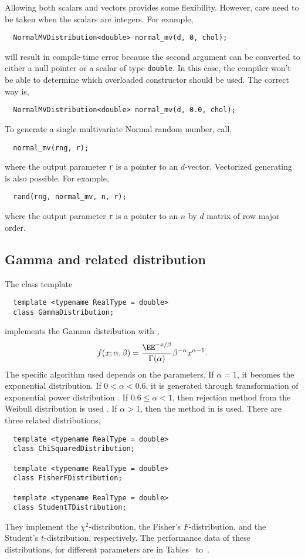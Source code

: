 Allowing both scalars and vectors provides some flexibility. However, care need
to be taken when the scalars are integers. For example,
\begin{Verbatim}
  NormalMVDistribution<double> normal_mv(d, 0, chol);
\end{Verbatim}
will result in compile-time error because the second argument can be converted
to either a null pointer or a scalar of type \verb|double|. In this case, the
compiler won't be able to determine which overloaded constructor should be
used. The correct way is,
\begin{Verbatim}
  NormalMVDistribution<double> normal_mv(d, 0.0, chol);
\end{Verbatim}
To generate a single multivariate Normal random number, call,
\begin{Verbatim}
  normal_mv(rng, r);
\end{Verbatim}
where the output parameter \verb|r| is a pointer to an $d$-vector. Vectorized
generating is also possible. For example,
\begin{Verbatim}
  rand(rng, normal_mv, n, r);
\end{Verbatim}
where the output parameter \verb|r| is a pointer to an $n$ by $d$ matrix of row
major order.

\subsection{Gamma and related distribution}
\label{sub:Gamma and related distribution}

The class template
\begin{Verbatim}
  template <typename RealType = double>
  class GammaDistribution;
\end{Verbatim}
implements the Gamma distribution with \pdf,
\begin{equation*}
  f(x;\alpha,\beta) =
  \frac{\EE^{-x/\beta}}{\Gamma(\alpha)}\beta^{-\alpha}x^{\alpha-1}.
\end{equation*}
The specific algorithm used depends on the parameters. If $\alpha = 1$, it
becomes the exponential distribution. If $0 < \alpha < 0.6$, it is generated
through transformation of exponential power distribution
\parencite[sec~2.6]{Devroye:1986gi}. If $0.6\le\alpha<1$, then rejection method
from the Weibull distribution is used \parencite[sec.~3.4]{Devroye:1986gi}. If
$\alpha > 1$, then the method in \textcite{Marsaglia:2000vq} is used. There are
three related distributions,
\begin{Verbatim}
  template <typename RealType = double>
  class ChiSquaredDistribution;

  template <typename RealType = double>
  class FisherFDistribution;

  template <typename RealType = double>
  class StudentTDistribution;
\end{Verbatim}
They implement the $\chi^2$-distribution, the Fisher's $F$-distribution, and
the Student's $t$-distribution, respectively. The performance data of these
distributions, for different parameters are in Tables~ to~.

